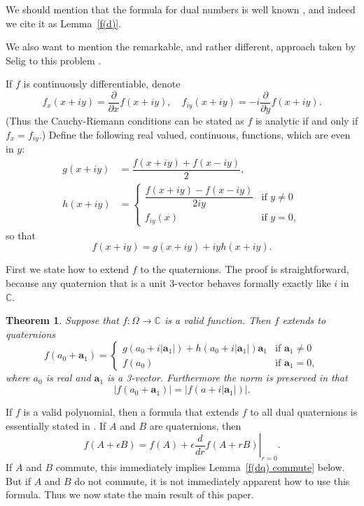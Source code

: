 \documentclass[12pt,reqno]{amsart}
\newtheorem{theorem}{Theorem}
\begin{document}
We should mention that the formula for dual numbers is well known \cite{wiki-1}, and indeed we cite it as Lemma~\ref{f(d)}.

We also want to mention the remarkable, and rather different, approach taken by Selig  to this problem \cite{selig}.

If $f$ is continuously differentiable, denote
\begin{equation}
f_x(x+iy) = \dfrac{\partial}{\partial x} f(x+iy) , \quad
f_{iy}(x+iy) = -i\dfrac{\partial}{\partial y} f(x+iy) .
\end{equation}
(Thus the Cauchy-Riemann conditions can be stated as $f$ is analytic if and only if $f_x = f_{iy}$.)  Define the following real valued, continuous, functions, which are even in $y$:
\begin{align}
\label{g}
g(x+iy) &= \dfrac{f(x+iy) + f(x-iy)} 2, \\
\label{h}
h(x+iy) &= \begin{cases}
\dfrac{f(x+iy)-f(x-iy)}{2iy} &\text{if $y \ne 0$} \\
f_{iy} (x) &\text{if $y = 0$} ,
\end{cases}
\end{align}
so that
\begin{equation}
f(x+iy) = g(x+iy) + i y h(x+iy) .
\end{equation}

First we state how to extend $f$ to the quaternions.  The proof is straightforward, because any quaternion that is a unit 3-vector behaves formally exactly like $i$ in $\mathbb C$.

\begin{theorem}
\label{f(q)}
Suppose that $f:\Omega \to \mathbb C$ is a valid function.  Then $f$ extends to quaternions
\begin{equation}
f(a_0 + \bm a_1) = \begin{cases}
g(a_0+i|\bm a_1|) +h(a_0+i|\bm a_1|) \bm a_1 & \text{if $\bm a_1 \ne 0$} \\
f(a_0) & \text{if $\bm a_1 = 0$}, \end{cases}
\end{equation}
where $a_0$ is real and $\bm a_1$ is a 3-vector.  Furthermore the norm is preserved in that
\begin{equation}
| f(a_0 + \bm a_1) | = | f(a + i |\bm a_1|) | .
\end{equation}
\end{theorem}

If $f$ is a valid polynomial, then a formula that extends $f$ to all dual quaternions is essentially stated in \cite{wiki-1}.  If $A$ and $B$ are quaternions, then
\begin{equation}
\label{proto f(dq)}
f(A + \epsilon B) = f(A) + \epsilon \left.\frac d{dr} f(A + rB) \right|_{r=0}.
\end{equation}
If $A$ and $B$ commute, this immediately implies Lemma~\ref{f(dq) commute} below.  But if $A$ and $B$ do not commute, it is not immediately apparent how to use this formula.  Thus we now state the main result of this paper.
\end{document}
